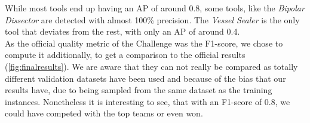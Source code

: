 \begin{figure}[h]
\end{figure}

While most tools end up having an AP of around 0.8, some tools, like the \emph{Bipolar Dissector} are detected with almost 100\% precision. The \emph{Vessel Sealer} is the only tool that deviates from the rest, with only an AP of around 0.4.\\
As the official quality metric of the Challenge was the F1-score, we chose to compute it additionally, to get a comparison to the official results (\ref{fig:finalresults}). We are aware that they can not really be compared as totally different validation datasets have been used and because of the bias that our results have, due to being sampled from the same dataset as the training instances. Nonetheless it is interesting to see, that with an F1-score of 0.8, we could have competed with the top teams or even won.